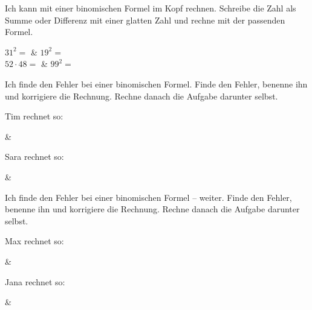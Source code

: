 \begin{aufgabe}{Ich kann mit einer binomischen Formel im Kopf rechnen. Schreibe die Zahl als Summe oder Differenz mit einer glatten Zahl und rechne mit der passenden Formel.}
\begin{teilezwei}
\tz $31^2 =$ \leerfeld & \tz $19^2 =$ \leerfeld \\
\tz $52 \cdot 48 =$ \leerfeld & \tz $99^2 =$ \leerfeld \\
\end{teilezwei}
\end{aufgabe}

\begin{aufgabe}{Ich finde den Fehler bei einer binomischen Formel. Finde den Fehler, benenne ihn und korrigiere die Rechnung. Rechne danach die Aufgabe darunter selbst.}
\begin{teile}
\teil Tim rechnet so:
\end{teile}
\begin{gleichungsraster}[2]
 & \\ \noalign{\vspace{5mm}}
\end{gleichungsraster}
\begin{teile}
\teil Sara rechnet so:
\end{teile}
\begin{gleichungsraster}[2]
 & \\ \noalign{\vspace{5mm}}
\end{gleichungsraster}
\end{aufgabe}

\begin{aufgabe}{Ich finde den Fehler bei einer binomischen Formel – weiter. Finde den Fehler, benenne ihn und korrigiere die Rechnung. Rechne danach die Aufgabe darunter selbst.}
\begin{teile}
\teil Max rechnet so:
\end{teile}
\begin{gleichungsraster}[2]
 & \\ \noalign{\vspace{5mm}}
\end{gleichungsraster}
\begin{teile}
\teil Jana rechnet so:
\end{teile}
\begin{gleichungsraster}[2]
 & \\ \noalign{\vspace{5mm}}
\end{gleichungsraster}
\end{aufgabe}


